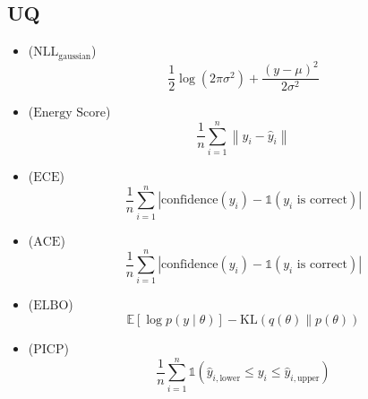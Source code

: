 \begin{formelsammlung}
  \subsection*{UQ}
  \begin{mdframed}[style=exercise]
    \begin{itemize}[label={},left=0pt]
      \item {} (\( \text{NLL}_{\text{gaussian}} \)) 
      {\scriptsize \[
          \frac{1}{2} \log(2 \pi \sigma^2) + \frac{(y - \mu)^2}{2 \sigma^2}
      \]} \vspace{-1.5em}
      \item {} (\( \text{Energy Score} \)) 
      {\scriptsize \[
          \frac{1}{n} \sum_{i=1}^{n} \left\| y_i - \hat{y}_i \right\|
      \]} \vspace{-1.5em}
      \item {} (\( \text{ECE} \)) 
      {\scriptsize \[
          \frac{1}{n} \sum_{i=1}^{n} \left| \text{confidence}(y_i) - \mathbb{1}(y_i \text{ is correct}) \right|
      \]} \vspace{-1.5em}
      \item {} (\( \text{ACE} \)) 
      {\scriptsize \[
          \frac{1}{n} \sum_{i=1}^{n} \left| \text{confidence}(y_i) - \mathbb{1}(y_i \text{ is correct}) \right|
      \]} \vspace{-1.5em}
      \item {} (\( \text{ELBO} \)) 
      {\scriptsize \[
          \mathbb{E}[\log p(y \mid \theta)] - \text{KL}(q(\theta) \parallel p(\theta))
      \]} \vspace{-1.5em}
      \item {} (\( \text{PICP} \)) 
      {\scriptsize \[
          \frac{1}{n} \sum_{i=1}^{n} \mathbb{1}(\hat{y}_{i,\text{lower}} \leq y_i \leq \hat{y}_{i,\text{upper}})
      \]} \vspace{-1.5em}
    \end{itemize}
  \end{mdframed}

  \pagebreak

  \begin{mdframed}[style=exercise]
    \begin{itemize}[label={},left=0pt]


\end{itemize}
\end{mdframed}
\end{formelsammlung}
